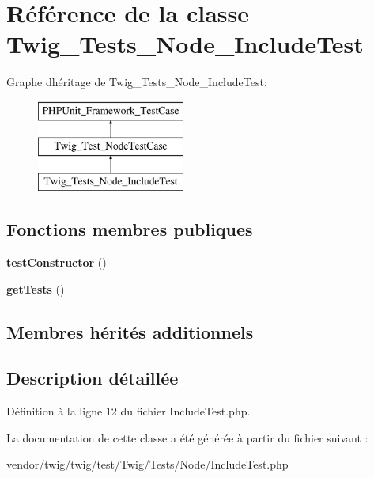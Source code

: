 \hypertarget{class_twig___tests___node___include_test}{}\section{Référence de la classe Twig\+\_\+\+Tests\+\_\+\+Node\+\_\+\+Include\+Test}
\label{class_twig___tests___node___include_test}
Graphe d\textquotesingle{}héritage de Twig\+\_\+\+Tests\+\_\+\+Node\+\_\+\+Include\+Test\+:\begin{figure}[H]
\begin{center}
\leavevmode
\includegraphics[height=3.000000cm]{class_twig___tests___node___include_test}
\end{center}
\end{figure}
\subsection*{Fonctions membres publiques}
\begin{DoxyCompactItemize}
\item 
{\bfseries test\+Constructor} ()\hypertarget{class_twig___tests___node___include_test_a47094dc941e72950570900d1418f89c6}{}\label{class_twig___tests___node___include_test_a47094dc941e72950570900d1418f89c6}

\item 
{\bfseries get\+Tests} ()\hypertarget{class_twig___tests___node___include_test_a7e247dd31cc8d37a6c97353a062a0080}{}\label{class_twig___tests___node___include_test_a7e247dd31cc8d37a6c97353a062a0080}

\end{DoxyCompactItemize}
\subsection*{Membres hérités additionnels}


\subsection{Description détaillée}


Définition à la ligne 12 du fichier Include\+Test.\+php.



La documentation de cette classe a été générée à partir du fichier suivant \+:\begin{DoxyCompactItemize}
\item 
vendor/twig/twig/test/\+Twig/\+Tests/\+Node/Include\+Test.\+php\end{DoxyCompactItemize}
